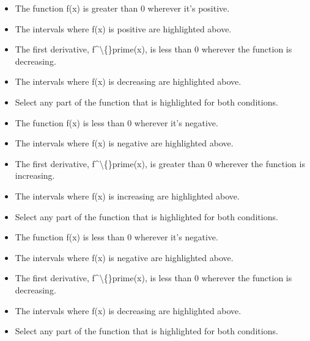 \documentclass{article}
\begin{document}
\begin{itemize}
  \item The function f(x) is greater than 0
                    wherever it's positive.
  \item The intervals
                        where f(x) is positive
                        are
                        highlighted above.
  \item The first derivative, f\textasciicircum{}\textbackslash\{\}prime(x), is less
                    than 0 wherever the function is decreasing.
  \item The intervals
                        where f(x) is decreasing
                        are
                        highlighted above.
  \item Select any part of the function that is highlighted for
                        both conditions.
  \item The function f(x) is less than 0
                    wherever it's negative.
  \item The intervals
                        where f(x) is negative
                        are
                        highlighted above.
  \item The first derivative, f\textasciicircum{}\textbackslash\{\}prime(x), is greater
                    than 0 wherever the function is increasing.
  \item The intervals
                        where f(x) is increasing
                        are
                        highlighted above.
  \item Select any part of the function that is highlighted for
                        both conditions.
  \item The function f(x) is less than 0
                    wherever it's negative.
  \item The intervals
                        where f(x) is negative
                        are
                        highlighted above.
  \item The first derivative, f\textasciicircum{}\textbackslash\{\}prime(x), is less
                    than 0 wherever the function is decreasing.
  \item The intervals
                        where f(x) is decreasing
                        are
                        highlighted above.
  \item Select any part of the function that is highlighted for
                        both conditions.
\end{itemize}
\end{document}
